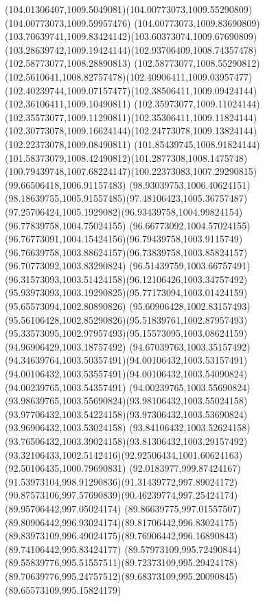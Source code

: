 {{\curveto(104.01306407,1009.5049081)(104.00773073,1009.55290809)(104.00773073,1009.59957476)
\curveto(104.00773073,1009.83690809)(103.70639741,1009.83424142)(103.60373074,1009.67690809)
\curveto(103.28639742,1009.19424144)(102.93706409,1008.74357478)(102.58773077,1008.28890813)
\curveto(102.58773077,1008.55290812)(102.5610641,1008.82757478)(102.40906411,1009.03957477)
\curveto(102.40239744,1009.07157477)(102.38506411,1009.09424144)(102.36106411,1009.10490811)
\curveto(102.35973077,1009.11024144)(102.35573077,1009.11290811)(102.35306411,1009.11824144)
\curveto(102.30773078,1009.16624144)(102.24773078,1009.13824144)(102.22373078,1009.08490811)
\curveto(101.85439745,1008.91824144)(101.58373079,1008.42490812)(101.2877308,1008.1475748)
\curveto(100.79439748,1007.68224147)(100.22373083,1007.29290815)(99.66506418,1006.91157483)
\curveto(98.93039753,1006.40624151)(98.18639755,1005.91557485)(97.48106423,1005.36757487)
\curveto(97.25706424,1005.1929082)(96.93439758,1004.99824154)(96.77839758,1004.75024155)
\curveto(96.66773092,1004.57024155)(96.76773091,1004.15424156)(96.79439758,1003.9115749)
\curveto(96.76639758,1003.88624157)(96.73839758,1003.85824157)(96.70773092,1003.83290824)
\curveto(96.51439759,1003.66757491)(96.31573093,1003.51424158)(96.12106426,1003.34757492)
\curveto(95.93973093,1003.19290825)(95.77173094,1003.01424159)(95.65573094,1002.80890826)
\curveto(95.60906428,1002.83157493)(95.56106428,1002.85290826)(95.51839761,1002.87957493)
\curveto(95.33573095,1002.97957493)(95.15573095,1003.08624159)(94.96906429,1003.18757492)
\curveto(94.67039763,1003.35157492)(94.34639764,1003.50357491)(94.00106432,1003.53157491)
\curveto(94.00106432,1003.53557491)(94.00106432,1003.54090824)(94.00239765,1003.54357491)
\curveto(94.00239765,1003.55690824)(93.98639765,1003.55690824)(93.98106432,1003.55024158)
\curveto(93.97706432,1003.54224158)(93.97306432,1003.53690824)(93.96906432,1003.53024158)
\curveto(93.84106432,1003.52624158)(93.76506432,1003.39024158)(93.81306432,1003.29157492)
\curveto(93.32106433,1002.5142416)(92.92506434,1001.60624163)(92.50106435,1000.79690831)
\curveto(92.0183977,999.87424167)(91.53973104,998.91290836)(91.31439772,997.89024172)
\curveto(90.87573106,997.57690839)(90.46239774,997.25424174)(89.95706442,997.05024174)
\curveto(89.86639775,997.01557507)(89.80906442,996.93024174)(89.81706442,996.83024175)
\curveto(89.83973109,996.49024175)(89.76906442,996.16890843)(89.74106442,995.83424177)
\curveto(89.57973109,995.72490844)(89.55839776,995.51557511)(89.72373109,995.29424178)
\curveto(89.70639776,995.24757512)(89.68373109,995.20090845)(89.65573109,995.15824179)
}}

